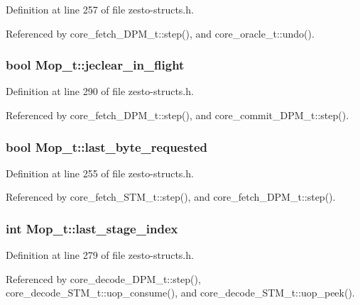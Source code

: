 Definition at line 257 of file zesto-structs.h.

Referenced by core\_\-fetch\_\-DPM\_\-t::step(), and core\_\-oracle\_\-t::undo().
\subsubsection[{jeclear\_\-in\_\-flight}]{\setlength{\rightskip}{0pt plus 5cm}bool {\bf Mop\_\-t::jeclear\_\-in\_\-flight}}\label{structMop__t_e6995a52499b926cb6b9f929208a5fff}




Definition at line 290 of file zesto-structs.h.

Referenced by core\_\-fetch\_\-DPM\_\-t::step(), and core\_\-commit\_\-DPM\_\-t::step().
\subsubsection[{last\_\-byte\_\-requested}]{\setlength{\rightskip}{0pt plus 5cm}bool {\bf Mop\_\-t::last\_\-byte\_\-requested}}\label{structMop__t_ea69aabb30124f2a67afc5c5aa042faf}




Definition at line 255 of file zesto-structs.h.

Referenced by core\_\-fetch\_\-STM\_\-t::step(), and core\_\-fetch\_\-DPM\_\-t::step().
\subsubsection[{last\_\-stage\_\-index}]{\setlength{\rightskip}{0pt plus 5cm}int {\bf Mop\_\-t::last\_\-stage\_\-index}}\label{structMop__t_aa7435f0fa93379e266fb2695a69e1f3}




Definition at line 279 of file zesto-structs.h.

Referenced by core\_\-decode\_\-DPM\_\-t::step(), core\_\-decode\_\-STM\_\-t::uop\_\-consume(), and core\_\-decode\_\-STM\_\-t::uop\_\-peek().
